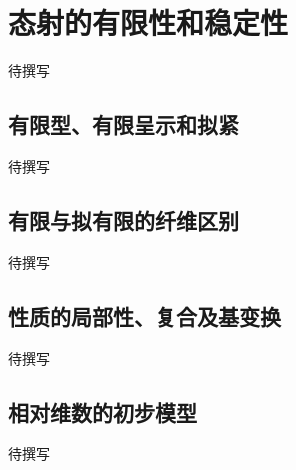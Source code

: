 
% 
% 

\section{态射的有限性和稳定性}
\label{g5:sec:1102}

待撰写

\subsection{有限型、有限呈示和拟紧}
\label{g5:subsec:1102:01}
待撰写

\subsection{有限与拟有限的纤维区别}
\label{g5:subsec:1102:02}
待撰写

\subsection{性质的局部性、复合及基变换}
\label{g5:subsec:1102:03}
待撰写

\subsection{相对维数的初步模型}
\label{g5:subsec:1102:04}
待撰写
